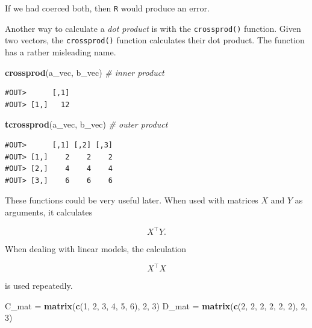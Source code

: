 \documentclass[]{book}
\newenvironment{Shaded}{\begin{snugshade}}{\end{snugshade}}
\newcommand{\KeywordTok}[1]{\textcolor[rgb]{0.13,0.29,0.53}{\textbf{#1}}}
\newcommand{\DecValTok}[1]{\textcolor[rgb]{0.00,0.00,0.81}{#1}}
\newcommand{\StringTok}[1]{\textcolor[rgb]{0.31,0.60,0.02}{#1}}
\newcommand{\CommentTok}[1]{\textcolor[rgb]{0.56,0.35,0.01}{\textit{#1}}}
\newcommand{\OperatorTok}[1]{\textcolor[rgb]{0.81,0.36,0.00}{\textbf{#1}}}
\newcommand{\NormalTok}[1]{#1}
\theoremstyle{definition}
\theoremstyle{definition}
\theoremstyle{definition}
\theoremstyle{remark}
\begin{document}
If we had coerced both, then \texttt{R} would produce an error.

\begin{Shaded}
\end{Shaded}

Another way to calculate a \emph{dot product} is with the
\texttt{crossprod()} function. Given two vectors, the
\texttt{crossprod()} function calculates their dot product. The function
has a rather misleading name.

\begin{Shaded}
\begin{Highlighting}[]
\KeywordTok{crossprod}\NormalTok{(a_vec, b_vec)  }\CommentTok{# inner product}
\end{Highlighting}
\end{Shaded}

\begin{verbatim}
#OUT>      [,1]
#OUT> [1,]   12
\end{verbatim}

\begin{Shaded}
\begin{Highlighting}[]
\KeywordTok{tcrossprod}\NormalTok{(a_vec, b_vec)  }\CommentTok{# outer product}
\end{Highlighting}
\end{Shaded}

\begin{verbatim}
#OUT>      [,1] [,2] [,3]
#OUT> [1,]    2    2    2
#OUT> [2,]    4    4    4
#OUT> [3,]    6    6    6
\end{verbatim}

These functions could be very useful later. When used with matrices
\(X\) and \(Y\) as arguments, it calculates

\[
X^\top Y.
\]

When dealing with linear models, the calculation

\[
X^\top X
\]

is used repeatedly.

\begin{Shaded}
\begin{Highlighting}[]
\NormalTok{C_mat =}\StringTok{ }\KeywordTok{matrix}\NormalTok{(}\KeywordTok{c}\NormalTok{(}\DecValTok{1}\NormalTok{, }\DecValTok{2}\NormalTok{, }\DecValTok{3}\NormalTok{, }\DecValTok{4}\NormalTok{, }\DecValTok{5}\NormalTok{, }\DecValTok{6}\NormalTok{), }\DecValTok{2}\NormalTok{, }\DecValTok{3}\NormalTok{)}
\NormalTok{D_mat =}\StringTok{ }\KeywordTok{matrix}\NormalTok{(}\KeywordTok{c}\NormalTok{(}\DecValTok{2}\NormalTok{, }\DecValTok{2}\NormalTok{, }\DecValTok{2}\NormalTok{, }\DecValTok{2}\NormalTok{, }\DecValTok{2}\NormalTok{, }\DecValTok{2}\NormalTok{), }\DecValTok{2}\NormalTok{, }\DecValTok{3}\NormalTok{)}
\end{Highlighting}
\end{Shaded}
\end{document}
